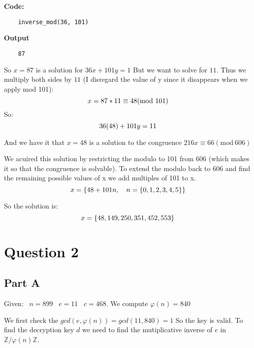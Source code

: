 \documentclass{article}
\numberwithin{equation}{subsection}
\begin{document}
\textbf{Code:}
\begin{lstlisting}
	inverse_mod(36, 101)
\end{lstlisting}
\textbf{Output}
\begin{lstlisting}
	87
\end{lstlisting}

\newpage
	\thispagestyle{fancy}


So $x=87$ is a solution for $36x+101y=1$ But we want to solve for $11$. Thus we multiply both sides by $11$ (I disregard
the value of y since it disappears when we apply mod 101):
\begin{equation}\notag
	x = 87*11 \equiv 48 (\textrm{mod}\ 101)	
\end{equation}
So:
\begin{equation}\notag
	36(48) + 101y = 11	
\end{equation}

And we have it that $x=48$ is a solution to the congruence $216x \equiv 66(\textrm{mod} \ 606)$


We acuired this solution by restricting the modulo to 101 from 606 (which makes it so that the congruence is solvable).
To extend the modulo back to 606 and find the remaining possible values of x we add multiples of 101 to x.
\begin{equation}\notag
	x = \{48+101n, \quad n = \{0,1,2,3,4,5\}\}	
\end{equation}

So the solution is:
\begin{equation}\notag
	x = \{48, 149, 250, 351, 452, 553 \}	
\end{equation}

\newpage
	\thispagestyle{fancy}


\section*{Question 2}

\subsection*{Part A}
Given: \ $n=899$ \ $e=11$ \ $c=468$. We compute $\varphi(n) = 840$

We first check the $gcd(e, \varphi(n)) = gcd(11, 840) = 1$ So the key is valid.
To find the decryption key $d$ we need to find the mutiplicative inverse of $e$ in $\mathbb{Z}/\varphi(n)\mathbb{Z}$. 
\end{document}
